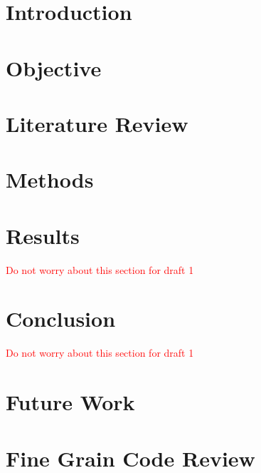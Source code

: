 \documentclass[12pt]{article}
\begin{document}
	\maketitle
	\tableofcontents

	\newpage

	\section{Introduction}

	\section{Objective}

	\section{Literature Review}

	\section{Methods}

	\section{Results}
		\textcolor{red}{Do not worry about this section for draft 1}

	\section{Conclusion}
		\textcolor{red}{Do not worry about this section for draft 1}
	
	\section{Future Work}



	\newpage %
	\backmatter
	\printbibliography

	\newpage %
	\printindex

	\newpage %
	\appendix
		\section{Fine Grain Code Review}
\end{document}
